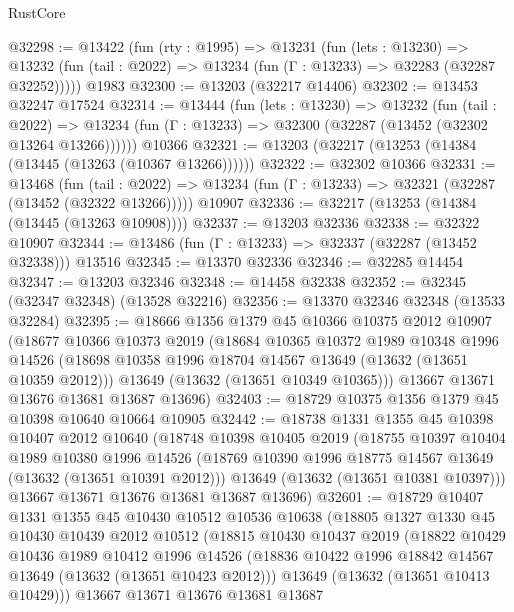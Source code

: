 \begin{lexlean}{RustCore}
\begin{coremodule}
@32298 := @13422
    (fun (rty : @1995) =>
    @13231
      (fun (lets : @13230) =>
      @13232 (fun (tail : @2022) => @13234 (fun (Γ : @13233) => @32283 (@32287 @32252)))))
    @1983
@32300 := @13203 (@32217 @14406)
@32302 := @13453 @32247 @17524
@32314 := @13444
    (fun (lets : @13230) =>
    @13232
      (fun (tail : @2022) =>
      @13234 (fun (Γ : @13233) => @32300 (@32287 (@13452 (@32302 @13264 @13266))))))
    @10366
@32321 := @13203 (@32217 (@13253 (@14384 (@13445 (@13263 (@10367 @13266))))))
@32322 := @32302 @10366
@32331 := @13468
    (fun (tail : @2022) => @13234 (fun (Γ : @13233) => @32321 (@32287 (@13452 (@32322 @13266)))))
    @10907
@32336 := @32217 (@13253 (@14384 (@13445 (@13263 @10908))))
@32337 := @13203 @32336
@32338 := @32322 @10907
@32344 := @13486 (fun (Γ : @13233) => @32337 (@32287 (@13452 @32338))) @13516
@32345 := @13370 @32336
@32346 := @32285 @14454
@32347 := @13203 @32346
@32348 := @14458 @32338
@32352 := @32345 (@32347 @32348) (@13528 @32216)
@32356 := @13370 @32346 @32348 (@13533 @32284)
@32395 := @18666
    @1356
    @1379
    @45
    @10366
    @10375
    @2012
    @10907
    (@18677
      @10366
      @10373
      @2019
      (@18684
        @10365
        @10372
        @1989
        @10348
        @1996
        @14526
        (@18698 @10358 @1996 @18704 @14567 @13649 (@13632 (@13651 @10359 @2012)))
        @13649
        (@13632 (@13651 @10349 @10365)))
      @13667
      @13671
      @13676
      @13681
      @13687
      @13696)
@32403 := @18729 @10375 @1356 @1379 @45 @10398 @10640 @10664 @10905
@32442 := @18738
    @1331
    @1355
    @45
    @10398
    @10407
    @2012
    @10640
    (@18748
      @10398
      @10405
      @2019
      (@18755
        @10397
        @10404
        @1989
        @10380
        @1996
        @14526
        (@18769 @10390 @1996 @18775 @14567 @13649 (@13632 (@13651 @10391 @2012)))
        @13649
        (@13632 (@13651 @10381 @10397)))
      @13667
      @13671
      @13676
      @13681
      @13687
      @13696)
@32601 := @18729
    @10407
    @1331
    @1355
    @45
    @10430
    @10512
    @10536
    @10638
    (@18805
      @1327
      @1330
      @45
      @10430
      @10439
      @2012
      @10512
      (@18815
        @10430
        @10437
        @2019
        (@18822
          @10429
          @10436
          @1989
          @10412
          @1996
          @14526
          (@18836 @10422 @1996 @18842 @14567 @13649 (@13632 (@13651 @10423 @2012)))
          @13649
          (@13632 (@13651 @10413 @10429)))
        @13667
        @13671
        @13676
        @13681
        @13687

\end{coremodule}
\end{lexlean}
